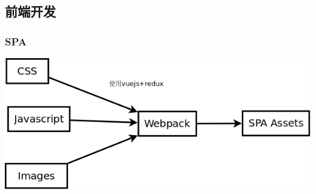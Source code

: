 \documentclass[pdf]{beamer}
\begin{document}
\subsection{前端开发}
\begin{frame}
  \frametitle{SPA}
  \begin{center}
	  \includegraphics[width=1.0\textwidth]{3.png}
  \end{center}
\end{frame} 
\end{document}
